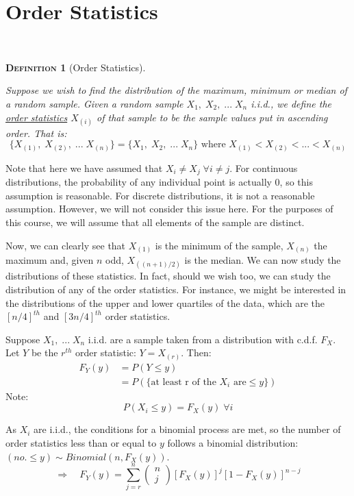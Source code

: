 \documentclass[12pt,a4paper]{article}
\newtheorem{definition}{\textsc{Definition}}[section]
\begin{document}
\clearpage
\section{Order Statistics}\label{order stats}$\;$

\begin{definition}[Order Statistics]$\;$\par\vspace{1cm}

Suppose we wish to find the distribution of the maximum, minimum or median of a random sample. Given a random sample $X_1,\; X_2,\; ...\; X_n$ i.i.d., we define the \underline{order statistics} $X_{(i)}$ of that sample to be the sample values put in ascending order. That is:
$$\{X_{(1)},\; X_{(2)},\; ...\; X_{(n)}\} = \{X_1,\; X_2,\; ...\; X_n\} \text{ where } X_{(1)}<X_{(2)}< ... < X_{(n)}$$
\end{definition}

Note that here we have assumed that $X_i \neq X_j \; \forall i \neq j$. For continuous distributions, the probability of any individual point is actually 0, so this assumption is reasonable. For discrete distributions, it is not a reasonable assumption. However, we will not consider this issue here. For the purposes of this course, we will assume that all elements of the sample are distinct.

Now, we can clearly see that $X_{(1)}$ is the minimum of the sample, $X_{(n)}$ the maximum and, given $n$ odd, $X_{((n+1)/2)}$ is the median. We can now study the distributions of these statistics. In fact, should we wish too, we can study the distribution of any of the order statistics. For instance, we might be interested in the distributions of the upper and lower quartiles of the data, which are the $[n/4]^{th}$ and $[3n/4]^{th}$ order statistics.

Suppose $X_1,\; ...\; X_n$ i.i.d. are a sample taken from a distribution with c.d.f. $F_X$. Let $Y$ be the $r^{th}$ order statistic: $Y=X_{(r)}$. Then:
\begin{align*}
F_Y(y) &= P(Y\leq y)\\
&= P(\{\text{at least r of the $X_i$ are} \leq y\})
\end{align*}
Note:
$$P(X_i \leq y) = F_X(y)\; \forall i$$

As $X_i$ are i.i.d., the conditions for a binomial process are met, so the number of order statistics less than or equal to $y$ follows a binomial distribution: $(no. \leq y) \sim Binomial(n, F_X(y))$.
$$\Rightarrow \quad F_Y(y) = \sum_{j=r}^n \left(\!\!\!\begin{array}{c} n\\j\end{array}\!\!\!\right) [F_X(y)]^j [1-F_X(y)]^{n-j}$$
\end{document}
